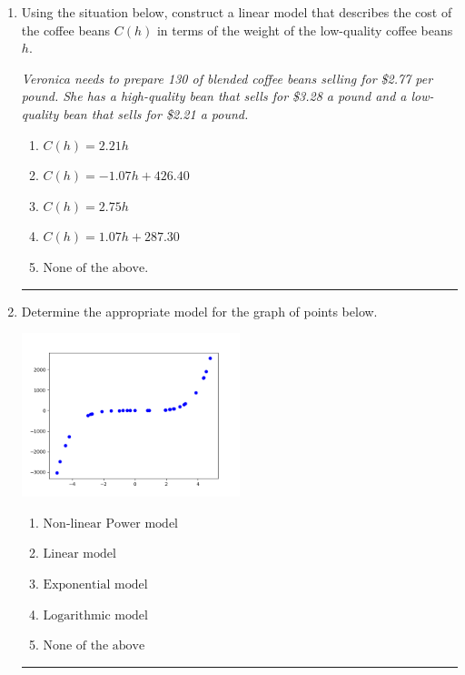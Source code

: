 \documentclass[14pt]{extbook}
\newcommand{\litem}[1]{\item#1\hspace*{-1cm}\rule{\textwidth}{0.4pt}}
\begin{document}
\begin{enumerate}
{\begin{enumerate}[label=\Alph*.]
\end{enumerate} }
\litem{
Using the situation below, construct a linear model that describes the cost of the coffee beans $C(h)$ in terms of the weight of the low-quality coffee beans $h$.
\begin{center}
    \textit{ Veronica needs to prepare 130 of blended coffee beans selling for \$2.77 per pound. She has a high-quality bean that sells for \$3.28 a pound and a low-quality bean that sells for \$2.21 a pound. }
\end{center}
\begin{enumerate}[label=\Alph*.]
\item \( C(h) = 2.21 h \)
\item \( C(h) = -1.07 h + 426.40 \)
\item \( C(h) = 2.75 h \)
\item \( C(h) = 1.07 h + 287.30 \)
\item \( \text{None of the above.} \)

\end{enumerate} }
\litem{
Determine the appropriate model for the graph of points below.
\begin{center}
    \includegraphics[width=0.5\textwidth]{../Figures/identifyModelGraph12C.png}
\end{center}
\begin{enumerate}[label=\Alph*.]
\item \( \text{Non-linear Power model} \)
\item \( \text{Linear model} \)
\item \( \text{Exponential model} \)
\item \( \text{Logarithmic model} \)
\item \( \text{None of the above} \)


\end{enumerate}}
\end{enumerate}
\end{document}
